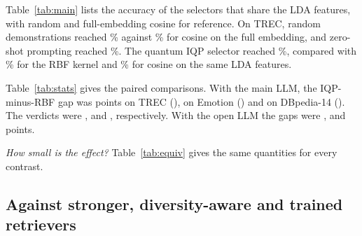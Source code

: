Table~\ref{tab:main} lists the accuracy of the selectors that share the LDA features, with random and
full-embedding cosine for reference. On TREC, random demonstrations reached \RTrecAccRandom\% against
\RTrecAccCosFull\% for cosine on the full embedding, and zero-shot prompting reached \RTrecAccZero\%. The
quantum IQP selector reached \RTrecAccIqp\%, compared with \RTrecAccRbf\% for the RBF kernel and
\RTrecAccCosLda\% for cosine on the same LDA features. \TMainPattern{}

\begin{table}[t]
\centering
\caption{Accuracy gaps in points, pooled over seeds, dimensions and queries, with 95\% cluster bootstrap
intervals. B/E/W/U counts the settings (seed $\times$ $d$) that the per-setting rule judged better,
equivalent (95\% interval within $\pm2$ points), worse or unclear for IQP vs.\ RBF.
Verdicts follow the preregistered rules.}
\label{tab:stats}
\footnotesize
\setlength{\tabcolsep}{2.2pt}
\resizebox{\columnwidth}{!}{}
\end{table}

Table~\ref{tab:stats} gives the paired comparisons. With the main LLM, the IQP-minus-RBF gap was
\RGapTrecMain{} points on TREC (\RCITrecMain), \RGapEmotionMain{} on Emotion (\RCIEmotionMain) and
\RGapDbpediaMain{} on DBpedia-14 (\RCIDbpediaMain). The verdicts were \emph{\RVerdictTrecMain},
\emph{\RVerdictEmotionMain} and \emph{\RVerdictDbpediaMain}, respectively. With the open LLM the gaps
were \RGapTrecOpen, \RGapEmotionOpen{} and \RGapDbpediaOpen{} points. \TRqOne{}

\begin{table}[t]
\centering
\caption{Pooled gaps (points, main LLM) for every preregistered contrast, with the TOST equivalence
$p$-value for a margin of $\pm\REquivMargin$ points ($^\ast$: equivalent at $\alpha=0.05$) and the minimum
detectable effect at 80\% power. Families are Holm-corrected separately in the per-setting tests.}
\label{tab:equiv}
\footnotesize
\setlength{\tabcolsep}{3pt}
\resizebox{\textwidth}{!}{}
\end{table}

\emph{How small is the effect?} \TEquiv{} Table~\ref{tab:equiv} gives the same quantities for every
contrast. \TRqEquiv{}

\subsection{Against stronger, diversity-aware and trained retrievers}

